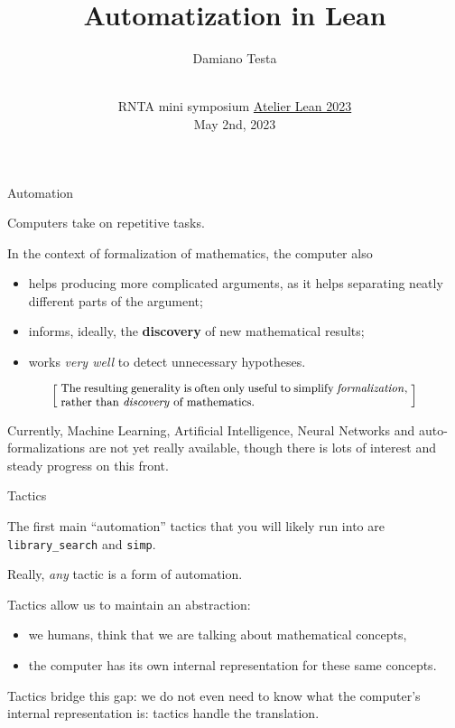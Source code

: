 \documentclass{beamer}
\title{Automatization in Lean}
\author{Damiano Testa}
\institute{University of Warwick}
\date{\\
\vspace{50pt}
RNTA mini symposium
\href{http://www.rnta.eu/7MSRNTA/lean.html}{Atelier Lean 2023}\\
\vspace{20pt}
May 2nd, 2023
}
\begin{document}
\frame{\titlepage}

\begin{frame}[fragile]
{Automation}

Computers take on repetitive tasks.

In the context of formalization of mathematics, the computer also

\begin{itemize}
\item
  helps producing more complicated arguments, as it helps separating neatly different parts of the argument;
\item
  informs, ideally, the {\textbf{discovery}} of new mathematical results;
\item
  works {\emph{very well}} to detect unnecessary hypotheses.
\end{itemize}

\smallskip
\[
  \left[ \;
  \makebox{\parbox{0.8\textwidth}{\small
  The resulting generality is often only useful to simplify {\emph{formalization}}, rather than {\emph{discovery}} of mathematics.
  }}
  \; \right]
\]
\bigskip

Currently, Machine Learning, Artificial Intelligence, Neural Networks and auto-formalizations are not yet really available, though there is lots of interest and steady progress on this front.
\end{frame}

\begin{frame}[fragile]{Tactics}

The first main ``automation'' tactics that you will likely run into are {\verb`library_search`} and {\verb`simp`}.

Really, {\emph{any}} tactic is a form of automation.

Tactics allow us to maintain an abstraction:

\begin{itemize}
\item
  we humans, think that we are talking about mathematical concepts,
\item
  the computer has its own internal representation for these same concepts.
\end{itemize}

Tactics bridge this gap: we do not even need to know what the computer's internal representation is: tactics handle the translation.
\end{frame}
\end{document}
